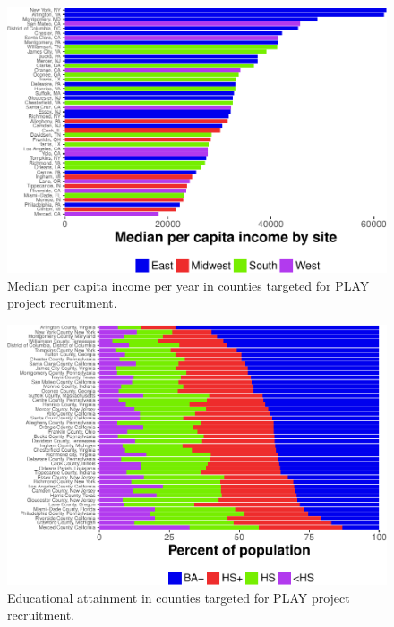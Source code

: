 \documentclass[english,man]{apa6}
\theoremstyle{definition}
\theoremstyle{definition}
\theoremstyle{definition}
\theoremstyle{remark}
\begin{document}
\begin{figure}

{\centering \includegraphics{figs/per-capita-income-plot-1} 

}

\caption{Median per capita income per year in counties targeted for PLAY project recruitment.}\label{fig:PLAY-econ-plot}
\end{figure}

\begin{figure}

{\centering \includegraphics{figs/ed-attain-bars-plot-1} 

}

\caption{Educational attainment in counties targeted for PLAY project recruitment.}\label{fig:PLAY-ed-plot}
\end{figure}
\end{document}
